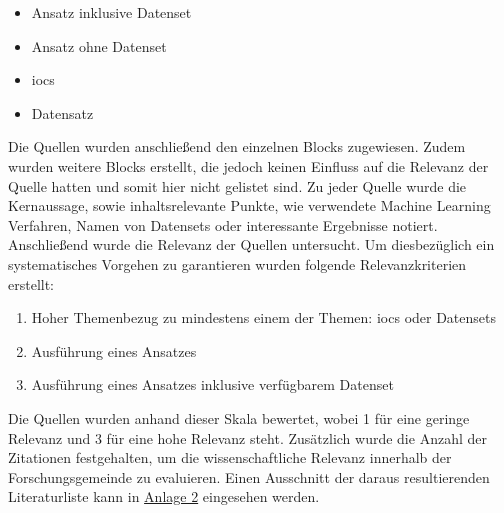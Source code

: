 \documentclass[
    12pt, %
    DIV10,
    ngerman, %
    a4paper, %
    oneside, %
    titlepage, %
    parskip=half, %
    headings=normal, %
    listof=totoc, %
    bibliography=totoc, %
    index=totoc, %
    captions=tableheading, %
    final %
]{scrreprt}
\begin{document}
\begin{itemize}
\item Ansatz inklusive Datenset
\item Ansatz ohne Datenset
\item \ac{iocs}
\item Datensatz
\end{itemize}
Die Quellen wurden anschlie{\ss}end den einzelnen Blocks zugewiesen. Zudem wurden weitere Blocks erstellt, die jedoch keinen Einfluss auf die Relevanz der Quelle hatten und somit hier nicht gelistet sind. Zu jeder Quelle wurde die Kernaussage, sowie inhaltsrelevante Punkte, wie verwendete Machine Learning Verfahren, Namen von Datensets oder interessante Ergebnisse notiert. Anschlie{\ss}end wurde die Relevanz der Quellen untersucht. 
Um diesbezüglich ein systematisches Vorgehen zu garantieren wurden folgende Relevanzkriterien erstellt:
\begin{enumerate}
\item Hoher Themenbezug zu mindestens einem der Themen: \ac{iocs} oder Datensets
\item Ausführung eines Ansatzes
\item Ausführung eines Ansatzes inklusive verfügbarem Datenset
\end{enumerate}
Die Quellen wurden anhand dieser Skala bewertet, wobei 1 für eine geringe Relevanz und 3 für eine hohe Relevanz steht.
Zusätzlich wurde die Anzahl der Zitationen festgehalten, um die wissenschaftliche Relevanz innerhalb der Forschungsgemeinde zu evaluieren. Einen Ausschnitt der daraus resultierenden Literaturliste kann in \hyperref[literaturr]{Anlage 2} eingesehen werden.
\end{document}
